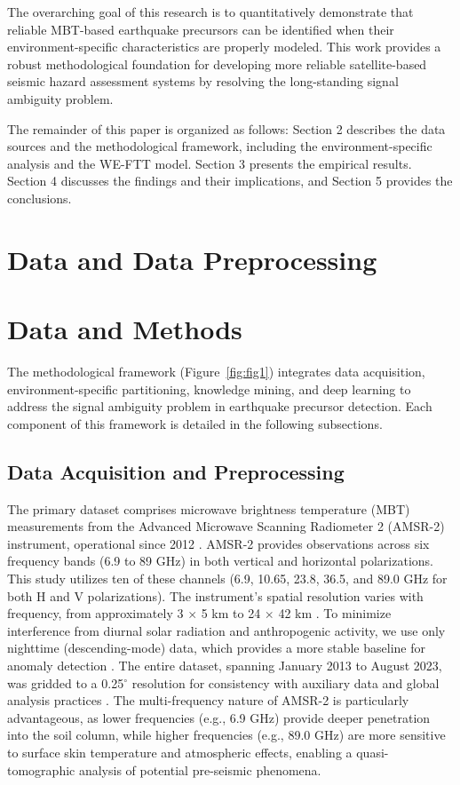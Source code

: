 \documentclass[preprint,review,12pt,authoryear]{elsarticle}
\begin{document}
The overarching goal of this research is to quantitatively demonstrate that reliable MBT-based earthquake precursors can be identified when their environment-specific characteristics are properly modeled. This work provides a robust methodological foundation for developing more reliable satellite-based seismic hazard assessment systems by resolving the long-standing signal ambiguity problem.

The remainder of this paper is organized as follows: Section 2 describes the data sources and the methodological framework, including the environment-specific analysis and the WE-FTT model. Section 3 presents the empirical results. Section 4 discusses the findings and their implications, and Section 5 provides the conclusions.

\section{Data and Data Preprocessing}
\section{Data and Methods}\label{sec:data_methods}

The methodological framework (Figure~\ref{fig:fig1}) integrates data acquisition, environment-specific partitioning, knowledge mining, and deep learning to address the signal ambiguity problem in earthquake precursor detection. Each component of this framework is detailed in the following subsections.

\subsection{Data Acquisition and Preprocessing}\label{sec:data_acquisition}

The primary dataset comprises microwave brightness temperature (MBT) measurements from the Advanced Microwave Scanning Radiometer 2 (AMSR-2) instrument, operational since 2012 \citep{kasaharaStatusAMSR22012}. AMSR-2 provides observations across six frequency bands (6.9 to 89 GHz) in both vertical and horizontal polarizations. This study utilizes ten of these channels (6.9, 10.65, 23.8, 36.5, and 89.0 GHz for both H and V polarizations). The instrument's spatial resolution varies with frequency, from approximately 3 $\times$ 5 km to 24 $\times$ 42 km \citep{kachiStatusGCOMW1AMSR22008}. To minimize interference from diurnal solar radiation and anthropogenic activity, we use only nighttime (descending-mode) data, which provides a more stable baseline for anomaly detection \citep{maedaDiscriminationLocalFaint2008}. The entire dataset, spanning January 2013 to August 2023, was gridded to a 0.25$^{\circ}$ resolution for consistency with auxiliary data and global analysis practices \citep{njokuRetrievalLandSurface1999,wuIdentifyingSeismicAnomalies2024}. The multi-frequency nature of AMSR-2 is particularly advantageous, as lower frequencies (e.g., 6.9 GHz) provide deeper penetration into the soil column, while higher frequencies (e.g., 89.0 GHz) are more sensitive to surface skin temperature and atmospheric effects, enabling a quasi-tomographic analysis of potential pre-seismic phenomena.
\end{document}

